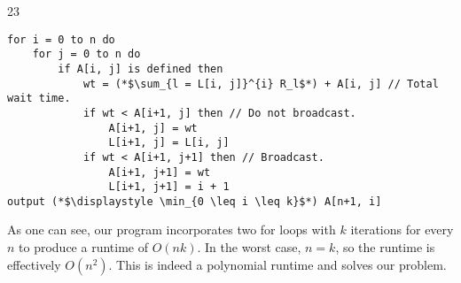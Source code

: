 \documentclass{article}
\begin{document}
\begin{prob} {23}
\begin{lstlisting}
for i = 0 to n do
    for j = 0 to n do
        if A[i, j] is defined then
            wt = (*$\sum_{l = L[i, j]}^{i} R_l$*) + A[i, j] // Total wait time.
            if wt < A[i+1, j] then // Do not broadcast.
                A[i+1, j] = wt
                L[i+1, j] = L[i, j]
            if wt < A[i+1, j+1] then // Broadcast.
                A[i+1, j+1] = wt
                L[i+1, j+1] = i + 1
output (*$\displaystyle \min_{0 \leq i \leq k}$*) A[n+1, i]
    \end{lstlisting}
    
    As one can see, our program incorporates two for loops with $k$ iterations for every $n$ to produce a runtime of $O(nk)$.  In the worst case, $n = k$, so the runtime is effectively $O(n^2)$.  This is indeed a polynomial runtime and solves our problem.
\end{prob}
\end{document}
